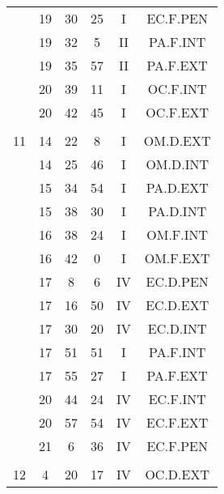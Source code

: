 \documentclass[12pt, a4paper]{article}
\begin{document}
\begin{multicols}{3}
{\begin{tabular}{c c c c c c}
	 	 	 	 & 19 & 30 & 25 & I & EC.F.PEN\\%
	 	 	 	 & 19 & 32 & 5 & II & PA.F.INT\\%
	 	 	 	 & 19 & 35 & 57 & II & PA.F.EXT\\%
	 	 	 	 & 20 & 39 & 11 & I & OC.F.INT\\%
	 	 	 	 & 20 & 42 & 45 & I & OC.F.EXT\\%
	 	 	 	 & & & & & \\%
	 	 	 	11 & 14 & 22 & 8 & I & OM.D.EXT\\%
	 	 	 	 & 14 & 25 & 46 & I & OM.D.INT\\%
	 	 	 	 & 15 & 34 & 54 & I & PA.D.EXT\\%
	 	 	 	 & 15 & 38 & 30 & I & PA.D.INT\\%
	 	 	 	 & 16 & 38 & 24 & I & OM.F.INT\\%
	 	 	 	 & 16 & 42 & 0 & I & OM.F.EXT\\%
	 	 	 	 & 17 & 8 & 6 & IV & EC.D.PEN\\%
	 	 	 	 & 17 & 16 & 50 & IV & EC.D.EXT\\%
	 	 	 	 & 17 & 30 & 20 & IV & EC.D.INT\\%
	 	 	 	 & 17 & 51 & 51 & I & PA.F.INT\\%
	 	 	 	 & 17 & 55 & 27 & I & PA.F.EXT\\%
	 	 	 	 & 20 & 44 & 24 & IV & EC.F.INT\\%
	 	 	 	 & 20 & 57 & 54 & IV & EC.F.EXT\\%
	 	 	 	 & 21 & 6 & 36 & IV & EC.F.PEN\\%
	 	 	 	 & & & & & \\%
	 	 	 	12 & 4 & 20 & 17 & IV & OC.D.EXT\\%
	 	 \end{tabular}
 	}
\end{multicols}
\end{document}
